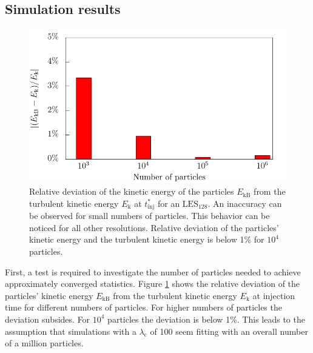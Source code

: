 \documentclass[11pt,a4paper,openany,oneside,parskip=half*]{article}
\begin{document}
\subsection{Simulation results}
\begin{figure}[h]
    \centering
    \begin{minipage}{0.5\textwidth}
        \centering
 	   \includegraphics[width=\linewidth]{./Abbildungen/kineticEnergy_numberOfParticles.pdf}
    \end{minipage}%
        \begin{minipage}{0.5\textwidth}
        \centering
        \caption{Relative deviation of the kinetic energy of the particles  $E_\mathrm{kB}$ from the turbulent kinetic energy $E_\mathrm{k}$ at $t^*_\mathrm{inj}$ for an $\mathrm{LES_{128}}$. An inaccuracy can be observed for small numbers of particles. This behavior can be noticed for all other resolutions. Relative deviation of the particles' kinetic energy and the turbulent kinetic energy is below 1\% for $10^4$ particles.}
	\label{kineticEnergy_numberofparticles}
    \end{minipage}
    \end{figure}
First, a test is required to investigate the number of particles needed to achieve approximately converged statistics.
\newline %
Figure \ref{kineticEnergy_numberofparticles} shows the relative deviation of the particles' kinetic energy $E_\mathrm{kB}$ from the turbulent kinetic energy $E_\mathrm{k}$ at injection time for different numbers of particles. For higher numbers of particles the deviation subsides. For $10^4$ particles the deviation is below 1\%.
This leads to the assumption that simulations with a $\lambda_\mathrm{c}$ of 100 seem fitting with an overall number of a million particles. 
\end{document}
